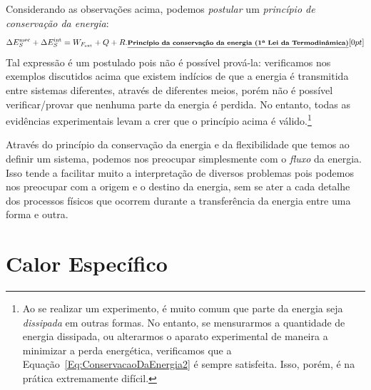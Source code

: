 Considerando as observações acima, podemos \emph{postular} um \emph{princípio de conservação da energia}:
\begin{equation}\label{Eq:ConservacaoDaEnergia2}
    \Delta E_S^{\text{mec}} + \Delta E_S^{\text{int}} = W_{F_{\text{ext}}} + Q + R. \mathnote{Princípio da conservação da energia (1\textordfeminine~Lei da Termodinâmica)}
\end{equation}
%
Tal expressão é um postulado pois não é possível prová-la: verificamos nos exemplos discutidos acima que existem indícios de que a energia é transmitida entre sistemas diferentes, através de diferentes meios, porém não é possível verificar/provar que nenhuma parte da energia é perdida. No entanto, todas as evidências experimentais levam a crer que o princípio acima é válido.\footnote{Ao se realizar um experimento, é muito comum que parte da energia seja \emph{dissipada} em outras formas. No entanto, se mensurarmos a quantidade de energia dissipada, ou alterarmos o aparato experimental de maneira a minimizar a perda energética, verificamos que a Equação~\eqref{Eq:ConservacaoDaEnergia2} é sempre satisfeita. Isso, porém, é na prática extremamente difícil.}

Através do princípio da conservação da energia e da flexibilidade que temos ao definir um sistema, podemos nos preocupar simplesmente com o \emph{fluxo} da energia. Isso tende a facilitar muito a interpretação de diversos problemas pois podemos nos preocupar com a origem e o destino da energia, sem se ater a cada detalhe dos processos físicos que ocorrem durante a transferência da energia entre uma forma e outra.


\section{Calor Específico}


